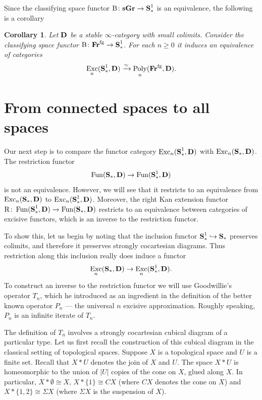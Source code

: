 \documentclass[psamsfonts]{amsart}
\theoremstyle{plain}
\newtheorem{cor}[thm]{Corollary}
\theoremstyle{definition}
\theoremstyle{remark}
\newcommand{\catname}[1]{{\normalfont\textbf{#1}}}
\newcommand{\spaces}{\catname{S}_*}
\newcommand{\connected}{\spaces^{1}}
\newcommand{\fr}{\allfr^{\mathrm{fg}}}
\newcommand{\allfr}{\catname{Fr}}
\newcommand{\sgr}{\catname{sGr}}
\newcommand{\classifying}{\operatorname{B}}
\newcommand{\rkan}{\mathrm{R}}
\DeclareMathOperator{\fun}{Fun}
\DeclareMathOperator{\poly}{Poly}
\DeclareMathOperator{\exc}{Exc}
\begin{document}
Since the classifying space functor $\classifying\colon \sgr \to \connected$ is an equivalence, the following is a corollary
\begin{cor}\label{cor:connected_to_fr}
Let $\catname{D}$ be a stable $\infty$-category with small colimits. Consider the classifying space functor $\classifying\colon \fr\to \connected$. For each $n\ge 0$ it induces an equivalence of categories
\[
\exc_n(\connected, \catname{D}) \xrightarrow{\simeq} \poly_n(\fr, \catname{D}).
\]
\end{cor}
\section{From connected spaces to all spaces}\label{section:connected to all}
Our next step is to compare the functor category $\exc_n(\connected, \catname{D})$ with $\exc_n(\spaces,\catname{D})$. The restriction functor \[\fun(\spaces, \catname{D}) \to \fun(\connected, \catname{D})\] is not an equivalence. However, we will see that it restricts to an equivalence from $\exc_n(\spaces, \catname{D})$ to $\exc_n(\connected, \catname{D})$. Moreover, the right Kan extension functor $\rkan\colon\fun(\connected, \catname{D})\to \fun(\spaces, \catname{D})$ restricts to an equivalence between categories of excisive functors, which is an inverse to the restriction functor.

To show this, let us begin by noting that the inclusion functor $\connected \hookrightarrow \spaces$ preserves colimits, and therefore it preserves strongly cocartesian diagrams. Thus restriction along this inclusion really does induce a functor 
\[
\exc_n(\spaces, \catname{D})\to \exc_n(\connected, \catname{D}).
\]
To construct an inverse to the restriction functor we will use Goodwillie's operator $T_n$, which he introduced as an ingredient in the definition of the better known operator $P_n$ --- the universal $n$ excisive approximation. Roughly speaking, $P_n$ is an infinite iterate of $T_n$. 

The definition of $T_n$ involves a strongly cocartesian cubical diagram of a particular type. Let us first recall the construction of this cubical diagram in the classical setting of topological spaces. Suppose $X$ is a topological space and $U$ is a finite set. Recall that $X*U$ denotes the join of $X$ and $U$. The space $X*U$ is homeomorphic to the union of $|U|$ copies of the cone on $X$, glued along $X$. In particular, $X*\emptyset\cong X$, $X*\{1\}\cong CX$ (where $CX$ denotes the cone on $X$) and $X*\{1, 2\}\cong \Sigma X$ (where $\Sigma X$ is the suspension of $X$).
\end{document}
